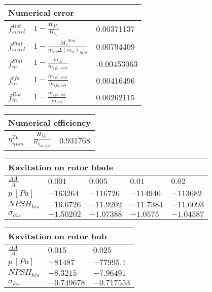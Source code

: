 \vspace{20pt}\newline
\begin{tabular}{|l|l|l|}
\multicolumn{3}{l}{Numerical error} \\ 
\hline
$f_{swirl}^{Rot}$ &$1-\frac{H_{M_z}}{H_{c_u}}$ & 0.00371137 \\ 
\hline
$f_{swirl}^{Stat}$ &$1-\frac{{M_z}^{Stat}}{\dot m_{in}\Delta(rc_u)_{Stat}}$ & 0.00794409 \\ 
\hline
$f_{\dot m}^{Stat}$ &$1-\frac{\dot m_{in}}{\dot m_{ifa,stat}}$ & -0.00453063 \\ 
\hline
$f_{\dot m}^{ifa}$ &$1-\frac{\dot m_{ifa,stat}}{\dot m_{ifa,rot}}$ & 0.00416496 \\ 
\hline
$f_{\dot m}^{Rot}$ &$1-\frac{\dot m_{ifa,rot}}{\dot m_{out}}$ & 0.00262115 \\ 
\hline
\end{tabular}
\vspace{20pt}\newline
\begin{tabular}{|l|l|l|}
\multicolumn{3}{l}{Numerical efficiency} \\ 
\hline
$\eta^{Tu}_{num}$ &$\frac{H_{M_z}}{H_{p_{tot,Rot}}}$ & 0.931768 \\ 
\hline
\end{tabular}
\vspace{20pt}\newline
\begin{tabular}{|l|l|l|l|l|}
\multicolumn{5}{l}{Kavitation on rotor blade} \\ 
\hline
$\frac{\Delta A}{A}$ & $0.001$& $0.005$& $0.01$& $0.02$  \\ 
\hline
$p \ [Pa]$ & $-163264$& $-116726$& $-114946$& $-113682$  \\ 
\hline
$NPSH_{his}$ & $-16.6726$& $-11.9202$& $-11.7384$& $-11.6093$  \\ 
\hline
$\sigma_{his}$ & $-1.50202$& $-1.07388$& $-1.0575$& $-1.04587$  \\ 
\hline
\end{tabular}
\vspace{20pt}\newline
\begin{tabular}{|l|l|l|}
\multicolumn{3}{l}{Kavitation on rotor hub} \\ 
\hline
$\frac{\Delta A}{A}$ & $0.015$& $0.025$  \\ 
\hline
$p \ [Pa]$ & $-81487$& $-77995.1$  \\ 
\hline
$NPSH_{his}$ & $-8.3215$& $-7.96491$  \\ 
\hline
$\sigma_{his}$ & $-0.749678$& $-0.717553$  \\ 
\hline
\end{tabular}
